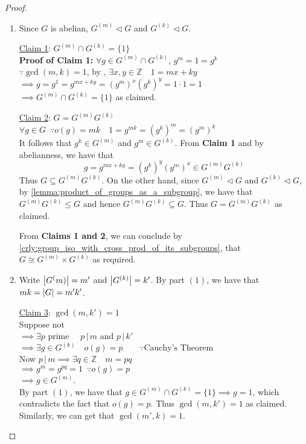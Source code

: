 \begin{proof}
  \begin{enumerate}
    \item Since $G$ is abelian, $G^{(m)} \triangleleft G$ and $G^{(k)} \triangleleft G$.

      \underline{Claim 1}: $G^{(m)} \cap G^{(k)} = \{1\}$ \\
      \textbf{Proof of Claim 1:} $\forall g \in G^{(m)} \cap G^{(k)}$, $g^m = 1 = g^k$ \\
      $\because \gcd(m, k) = 1$, by , $\exists x, y \in \mathbb{Z} \quad 1 = mx + ky$ \\
      $\implies g = g^1 = g^{mx + ky} = ( g^m )^x ( g^k )^y = 1 \cdot 1 = 1$ \\
      $\implies G^{(m)} \cap G^{(k)} = \{1\}$ as claimed.

      \underline{Claim 2}: $G = G^{(m)}G^{(k)}$ \\
      $\forall g \in G \enspace \because o(g) = mk \quad 1 = g^{mk} = ( g^k )^m = ( g^m )^k$ \\
      It follows that $g^k \in G^{(m)}$ and $g^m \in G^{(k)}$. From \textbf{Claim 1} and by abelianness, we have that
      \begin{equation*}
        g = g^{mx + ky} = (g^k)^y (g^m)^x \in G^{(m)}G^{(k)}
      \end{equation*}
      Thus $G \subseteq G^{(m)}G^{(k)}$. On the other hand, since $G^{(m)} \triangleleft G$ and $G^{(k)} \triangleleft G$, by \cref{lemma:product_of_groups_as_a_subgroup}, we have that $G^{(m)}G^{(k)} \leq G$ and hence $G^{(m)} G^{(k)} \subseteq G$. Thus $G = G^{(m)}G^{(k)}$ as claimed.

      From \textbf{Claims 1 and 2}, we can conclude by \cref{crly:group_iso_with_cross_prod_of_its_subgroups}, that $G \cong G^{(m)} \times G^{(k)}$ as required.

    \item Write $\left|G^(m)\right| = m'$ and $\left|G^{(k)}\right| = k'$. By part $(1)$, we have that $mk = \left|G\right| = m'k'$.

      \underline{Claim 3}: $\gcd(m, k') = 1$ \\
      Suppose not\\
      $\implies \exists p$ prime $ \quad p \, | \, m$ and $p \, | \, k'$\\
      $\implies \exists g \in G^{(k)} \quad o(g) = p \qquad \because \hyperref[thm:cauchy]{\text{Cauchy's Theorem}}$\\
      Now $p \, | \, m \implies \exists q \in \mathbb{Z} \quad m = pq$\\
      $\implies g^m = g^{pq} = 1 \enspace \because o(g) = p$\\
      $\implies g \in G^{(m)}$.\\
      By part $(1)$, we have that $g \in G^{(m)} \cap G^{(k)} = \{1\} \implies g = 1$, which contradicts the fact that $o(g) = p$. Thus $\gcd(m, k') = 1$ as claimed. Similarly, we can get that $\gcd(m', k) = 1$.


\end{enumerate}
\end{proof}
